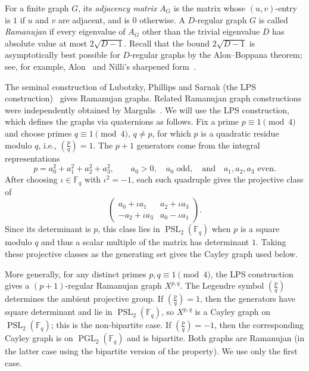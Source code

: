 \documentclass[10pt]{article}
\numberwithin{equation}{section}
\DeclareMathOperator{\PSL}{PSL}
\DeclareMathOperator{\PGL}{PGL}
\begin{document}
For a finite graph $G$, its \emph{adjacency matrix} $A_G$ is the matrix whose $(u,v)$-entry is $1$ if $u$ and $v$ are adjacent, and is $0$ otherwise. A  $D$-regular graph $G$ is called \emph{Ramanujan} if every eigenvalue of $A_G$ other than the trivial eigenvalue $D$ has absolute value at most $2\sqrt{D-1}$.
Recall that the bound $2\sqrt{D-1}$ is asymptotically best possible for $D$-regular graphs by the Alon--Boppana theorem; see, for example, Alon~\cite{Alon1986} and Nilli's sharpened form~\cite{Nilli1991}.

The seminal construction of Lubotzky, Phillips and Sarnak (the LPS construction)~\cite{LPS1988} gives Ramanujan graphs. Related Ramanujan graph constructions were independently obtained by Margulis~\cite{Margulis1988}. We will use the LPS construction, which defines the graphs
via quaternions as follows. Fix a prime $p\equiv1\pmod4$ and choose primes $q\equiv1\pmod4$, $q\neq p$, for which $p$ is a quadratic residue modulo $q$, i.e., $\left(\frac{p}{q}\right) = 1$. The $p+1$ generators come from the integral representations
\[
        p=a_0^2+a_1^2+a_2^2+a_3^2, \qquad a_0>0,\quad a_0\text{ odd},\quad\text{and}\quad a_1,a_2,a_3\text{ even}.
\]
After choosing $\iota\in\mathbb F_q$ with $\iota^2=-1$, each such quadruple gives the projective class of
\[
        \begin{pmatrix}
        a_0+\iota a_1 & a_2+\iota a_3\\
        -a_2+\iota a_3 & a_0-\iota a_1
        \end{pmatrix}.
\]
Since its determinant is $p$, this class lies in $\PSL_2(\mathbb F_q)$ when $p$ is a square modulo $q$ and thus a scalar multiple of the matrix has determinant $1$. Taking these projective classes as the generating set gives the Cayley graph used below.

More generally, for any distinct primes $p,q\equiv1\pmod4$, the LPS construction gives a $(p+1)$-regular Ramanujan graph $X^{p,q}$. The Legendre symbol $\left(\frac{p}{q}\right)$ determines the ambient projective group. If $\left(\frac{p}{q}\right)=1$, then the generators have square determinant and lie in $\PSL_2(\mathbb F_q)$, so $X^{p,q}$ is a Cayley graph on $\PSL_2(\mathbb F_q)$; this is the non-bipartite case. If $\left(\frac{p}{q}\right)=-1$, then the corresponding Cayley graph is on $\PGL_2(\mathbb F_q)$ and is bipartite. Both graphs are Ramanujan (in the latter case using the bipartite version of the property). We use only the first case.
\end{document}
